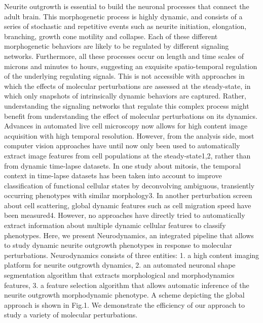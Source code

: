 Neurite outgrowth is essential to build the neuronal processes that connect the adult brain. This morphogenetic process is highly dynamic, and consists of a series of stochastic and repetitive events such as neurite initiation, elongation, branching, growth cone motility and collapse. Each of these different morphogenetic behaviors are likely to be regulated by different signaling networks. Furthermore, all these processes occur on length and time scales of microns and minutes to hours, suggesting an exquisite spatio-temporal regulation of the underlying regulating signals. This is not accessible with approaches in which the effects of molecular perturbations are assessed at the steady-state\cite{Snijder09,Collinet10}, in which only snapshots of intrinsically dynamic behaviors are captured. Rather, understanding the signaling networks that regulate this complex process might benefit from understanding the effect of molecular perturbations on its dynamics.
Advances in automated live cell microscopy now allows for high content image acquisition with high temporal resolution\cite{Held:2010dv}. However, from the analysis side, most computer vision approaches have until now only been used to automatically extract image features from cell populations at the steady-state1,2, rather than from dynamic time-lapse datasets. In one study about mitosis, the temporal context in time-lapse datasets has been taken into account to improve classification of functional cellular states by deconvolving ambiguous, transiently occurring phenotypes with similar morphology3. In another perturbation screen about cell scattering, global dynamic features such as cell migration speed have been measured4. However, no approaches have directly tried to automatically extract information about multiple dynamic cellular features to classify phenotypes.
Here, we present Neurodynamics, an integrated pipeline that allows to study dynamic neurite outgrowth phenotypes in response to molecular perturbations. Neurodynamics consists of three entities: 1. a high content imaging platform for neurite outgrowth dynamics, 2. an automated neuronal shape segmentation algorithm that extracts morphological and morphodynamics features, 3. a feature selection algorithm that allows automatic inference of the neurite outgrowth morphodynamic phenotype. A scheme depicting the global approach is shown in Fig.1. We demonstrate the efficiency of our approach to study a variety of molecular perturbations.